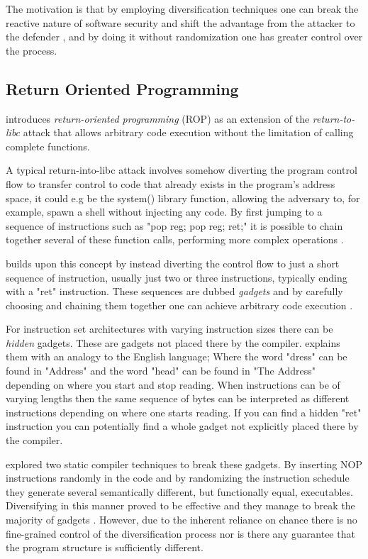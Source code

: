 The motivation is that by employing diversification techniques one can break the
reactive nature of software security and shift the advantage from the attacker to the
defender \cite{compiler-generated-sw-div}, and by doing it without randomization one has
greater control over the process.

\subsection{Return Oriented Programming}
\label{rop}

\textcite{rop} introduces \textit{return-oriented programming} (ROP) as an extension of
the \textit{return-to-libc}\cite{return-into-libc} attack that allows arbitrary code
execution without the limitation of calling complete functions.

A typical return-into-libc attack involves somehow diverting the program control
flow to transfer control to code that already exists in the program's address space,
it could e.g be the system() library function, allowing the adversary to, for example, spawn
a shell without injecting any code. By first jumping to a sequence of instructions such as
"pop reg; pop reg; ret;" it is possible to chain together several of these function calls,
performing more complex operations \cite{non-exec-stack,advanced-return-into-libc}.

\textcite{rop} builds upon this concept by instead diverting the control flow to just a short
sequence of instruction, usually just two or three instructions, typically ending with a
"ret" instruction. These sequences are dubbed \textit{gadgets} and by carefully choosing
and chaining them together one can achieve arbitrary code execution \cite{rop}.

For instruction set architectures with varying instruction sizes there can be
\textit{hidden} gadgets. These are gadgets not placed there by the compiler. \textcite{rop}
explains them with an analogy to the English language; Where the word "dress" can be found
in "Address" and the word "head" can be found in "The Address" depending on where you start
and stop reading. When instructions can be of varying lengths then the same sequence of
bytes can be interpreted as different instructions depending on where one starts reading.
If you can find a hidden "ret" instruction you can potentially find a whole gadget not
explicitly placed there by the compiler.

\textcite{large-scale-automated} explored two static compiler techniques to break these
gadgets. By inserting NOP instructions randomly in the code and by randomizing the
instruction schedule they generate several semantically different, but functionally equal,
executables. Diversifying in this manner proved to be effective and they manage to break
the majority of gadgets \cite{large-scale-automated}. However, due to the inherent reliance
on chance there is no fine-grained control of the diversification process nor is there
any guarantee that the program structure is sufficiently different.
